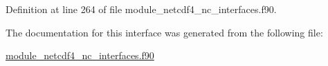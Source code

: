 Definition at line 264 of file module\+\_\+netcdf4\+\_\+nc\+\_\+interfaces.\+f90.



The documentation for this interface was generated from the following file\+:\begin{DoxyCompactItemize}
\item 
\hyperlink{module__netcdf4__nc__interfaces_8f90}{module\+\_\+netcdf4\+\_\+nc\+\_\+interfaces.\+f90}\end{DoxyCompactItemize}
